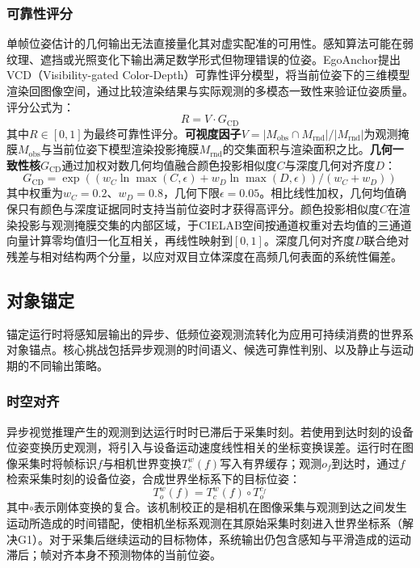 \documentclass[review]{vgtc}
\begin{document}
\subsubsection{可靠性评分}\label{sec:reliability}

单帧位姿估计的几何输出无法直接量化其对虚实配准的可用性。感知算法可能在弱纹理、遮挡或光照变化下输出满足数学形式但物理错误的位姿。EgoAnchor提出VCD（Visibility-gated Color-Depth）可靠性评分模型，将当前位姿下的三维模型渲染回图像空间，通过比较渲染结果与实际观测的多模态一致性来验证位姿质量。评分公式为：
\begin{equation}
R = V \cdot G_{\mathrm{CD}}
\end{equation}
其中$R \in [0,1]$为最终可靠性评分。\textbf{可视度因子}$V = \lvert M_{\mathrm{obs}} \cap M_{\mathrm{rnd}} \rvert / \lvert M_{\mathrm{rnd}} \rvert$为观测掩膜$M_{\mathrm{obs}}$与当前位姿下模型渲染投影掩膜$M_{\mathrm{rnd}}$的交集面积与渲染面积之比。\textbf{几何一致性核}$G_{\mathrm{CD}}$通过加权对数几何均值融合颜色投影相似度$C$与深度几何对齐度$D$：
\begin{equation}
G_{\mathrm{CD}} = \exp\!\left((w_C \ln \max\!\left(C, \epsilon\right) + w_D \ln \max\!\left(D, \epsilon\right)) / (w_C + w_D)\right)
\end{equation}
其中权重为$w_C = 0.2$、$w_D = 0.8$，几何下限$\epsilon = 0.05$。相比线性加权，几何均值确保只有颜色与深度证据同时支持当前位姿时才获得高评分。颜色投影相似度$C$在渲染投影与观测掩膜交集的内部区域，于CIELAB空间按通道权重对去均值的三通道向量计算零均值归一化互相关，再线性映射到$[0,1]$。深度几何对齐度$D$联合绝对残差与相对结构两个分量，以应对双目立体深度在高频几何表面的系统性偏差。

\subsection{对象锚定}\label{sec:anchoring}

锚定运行时将感知层输出的异步、低频位姿观测流转化为应用可持续消费的世界系对象锚点。核心挑战包括异步观测的时间语义、候选可靠性判别、以及静止与运动期的不同输出策略。

\subsubsection{时空对齐}\label{sec:alignment}

异步视觉推理产生的观测到达运行时时已滞后于采集时刻。若使用到达时刻的设备位姿变换历史观测，将引入与设备运动速度线性相关的坐标变换误差。运行时在图像采集时将帧标识$f$与相机世界变换$T_c^w(f)$写入有界缓存；观测$o_f$到达时，通过$f$检索采集时刻的设备位姿，合成世界坐标系下的目标位姿：
\begin{equation}
T_o^w (f) = T_c^w (f) \circ T_o^{c_f}
\label{eq:world-transform}
\end{equation}
其中$\circ$表示刚体变换的复合。该机制校正的是相机在图像采集与观测到达之间发生运动所造成的时间错配，使相机坐标系观测在其原始采集时刻进入世界坐标系（解决G1）。对于采集后继续运动的目标物体，系统输出仍包含感知与平滑造成的运动滞后；帧对齐本身不预测物体的当前位姿。
\end{document}
